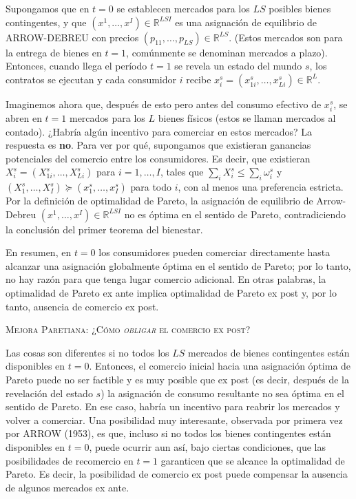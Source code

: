 \documentclass[10pt,a4paper]{article}
\begin{document}
Supongamos que en $t=0$ se establecen mercados para los $LS$ posibles bienes contingentes, y que $(x^1,\ldots,x^I)\in\mathbb{R}^{LSI}$ es una asignación de equilibrio de ARROW-DEBREU con precios $(p_{11},\ldots,p_{LS})\in\mathbb{R}^{LS}$. (Estos mercados son para la entrega de bienes en $t=1$, comúnmente se denominan mercados a plazo). Entonces, cuando llega el período $t=1$ se revela un estado del mundo $s$, los contratos se ejecutan y cada consumidor $i$ recibe $x^s_i=(x^s_{1i},\ldots,x^s_{Li})\in\mathbb{R}^L$. 

Imaginemos ahora que, después de esto pero antes del consumo efectivo de $x^s_i$, se abren en $t=1$ mercados para los $L$ bienes físicos (estos se llaman mercados al contado). ¿Habría algún incentivo para comerciar en estos mercados? La respuesta es \textbf{no}. Para ver por qué, supongamos que existieran ganancias potenciales del comercio entre los consumidores. Es decir, que existieran $X^s_i=(X^s_{1i},\ldots,X^s_{Li})$ para $i=1,\ldots,I$, tales que $\sum_i X^s_i\le \sum_i \omega^s_i$ y $(X^s_1,\ldots,X^s_I)\succeq (x^s_1,\ldots,x^s_I)$ para todo $i$, con al menos una preferencia estricta. Por la definición de optimalidad de Pareto, la asignación de equilibrio de Arrow-Debreu $(x^1,\ldots,x^I)\in\mathbb{R}^{LSI}$ no es óptima en el sentido de Pareto, contradiciendo la conclusión del primer teorema del bienestar. 

En resumen, en $t=0$ los consumidores pueden comerciar directamente hasta alcanzar una asignación globalmente óptima en el sentido de Pareto; por lo tanto, no hay razón para que tenga lugar comercio adicional. En otras palabras, la optimalidad de Pareto ex ante implica optimalidad de Pareto ex post y, por lo tanto, ausencia de comercio ex post.


\textsc{Mejora Paretiana: ¿Cómo \textit{obligar} el comercio ex post?}

Las cosas son diferentes si no todos los $LS$ mercados de bienes contingentes están disponibles en $t=0$. Entonces, el comercio inicial hacia una asignación óptima de Pareto puede no ser factible y es muy posible que ex post (es decir, después de la revelación del estado $s$) la asignación de consumo resultante no sea óptima en el sentido de Pareto. En ese caso, habría un incentivo para reabrir los mercados y volver a comerciar. Una posibilidad muy interesante, observada por primera vez por ARROW (1953), es que, incluso si no todos los bienes contingentes están disponibles en $t=0$, puede ocurrir aun así, bajo ciertas condiciones, que las posibilidades de recomercio en $t=1$ garanticen que se alcance la optimalidad de Pareto. Es decir, la posibilidad de comercio ex post puede compensar la ausencia de algunos mercados ex ante. 
\end{document}
